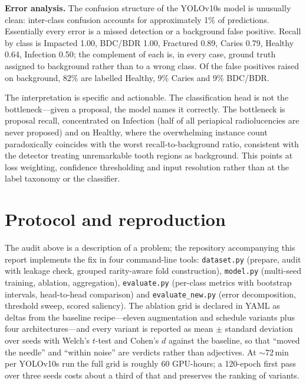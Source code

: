 \documentclass[10pt,twocolumn]{article}
\newcommand{\clsname}[1]{\textsf{#1}}
\begin{document}
\textbf{Error analysis.} The confusion structure of the YOLOv10s model is
unusually clean: inter-class confusion accounts for approximately 1\% of
predictions. Essentially every error is a missed detection or a background false
positive. Recall by class is \clsname{Impacted} 1.00, \clsname{BDC/BDR} 1.00,
\clsname{Fractured} 0.89, \clsname{Caries} 0.79, \clsname{Healthy} 0.64,
\clsname{Infection} 0.50; the complement of each is, in every case, ground truth
assigned to background rather than to a wrong class. Of the false positives
raised on background, 82\% are labelled \clsname{Healthy}, 9\%
\clsname{Caries} and 9\% \clsname{BDC/BDR}.

The interpretation is specific and actionable. The classification head is not the
bottleneck---given a proposal, the model names it correctly. The bottleneck is
proposal recall, concentrated on \clsname{Infection} (half of all periapical
radiolucencies are never proposed) and on \clsname{Healthy}, where the
overwhelming instance count paradoxically coincides with the worst
recall-to-background ratio, consistent with the detector treating unremarkable
tooth regions as background. This points at loss weighting, confidence
thresholding and input resolution rather than at the label taxonomy or the
classifier.

\section{Protocol and reproduction}

The audit above is a description of a problem; the repository accompanying this
report implements the fix in four command-line tools: \texttt{dataset.py}
(prepare, audit with leakage check, grouped rarity-aware fold construction),
\texttt{model.py} (multi-seed training, ablation, aggregation),
\texttt{evaluate.py} (per-class metrics with bootstrap intervals, head-to-head
comparison) and \texttt{evaluate\_new.py} (error decomposition, threshold
sweep, scored saliency). The
ablation grid is declared in YAML as deltas from the baseline recipe---eleven
augmentation and schedule variants plus four architectures---and every variant
is reported as mean $\pm$ standard deviation over seeds with Welch's $t$-test
and Cohen's $d$ against the baseline, so that ``moved the needle'' and ``within
noise'' are verdicts rather than adjectives. At $\sim$72\,min per YOLOv10s run
the full grid is roughly 60 GPU-hours; a 120-epoch first pass over three seeds
costs about a third of that and preserves the ranking of variants.
\end{document}
